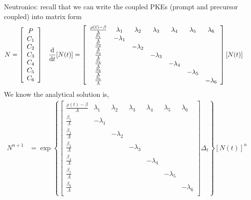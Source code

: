 \documentclass{school-22.211-notes}
\begin{document}
Neutronics: recall that we can write the coupled PKEs (prompt and precursor coupled) into matrix form 
\begin{align}
N &= \left[ \begin{array}{c} P \\ C_1 \\ C_2 \\ C_3 \\ C_4 \\ C_5 \\ C_6 \end{array} \right]  
& \frac{\mathrm{d}}{\mathrm{d}t} [N(t)] &= \left[ \begin{array}{ccccccc}
\frac{\rho(t) - \beta}{\Lambda} & \lambda_1  & \lambda_2 & \lambda_3 & \lambda_4 & \lambda_5 & \lambda_6 \\ 
\frac{\beta_1}{\Lambda}         & - \lambda_1 &          &           &           &           & \\
\frac{\beta_2}{\Lambda}         &             & -\lambda_2 &         &           &           & \\
\frac{\beta_3}{\Lambda}         &             &            & -\lambda_3 &        &           & \\
\frac{\beta_4}{\Lambda}         &             &           &          & - \lambda_4 &         & \\
\frac{\beta_5}{\Lambda}         &             &           &          &           & -\lambda_5 & \\
\frac{\beta_6}{\Lambda}         &             &           &          &           &           & - \lambda_6 \\
\end{array} \right] [N(t)]
\end{align}
We know the analytical solution is, 
\begin{align}
N^{n+1}  &= \exp \left\{ \left[ \begin{array}{ccccccc}
\frac{\rho(t) - \beta}{\Lambda} & \lambda_1  & \lambda_2 & \lambda_3 & \lambda_4 & \lambda_5 & \lambda_6 \\ 
\frac{\beta_1}{\Lambda}         & - \lambda_1 &          &           &           &           & \\
\frac{\beta_2}{\Lambda}         &             & -\lambda_2 &         &           &           & \\
\frac{\beta_3}{\Lambda}         &             &            & -\lambda_3 &        &           & \\
\frac{\beta_4}{\Lambda}         &             &           &          & - \lambda_4 &         & \\
\frac{\beta_5}{\Lambda}         &             &           &          &           & -\lambda_5 & \\
\frac{\beta_6}{\Lambda}         &             &           &          &           &           & - \lambda_6 \\
\end{array} \right]  \Delta_t \right\}  [N(t)]^n  \label{n-analytical}
\end{align}
\end{document}
